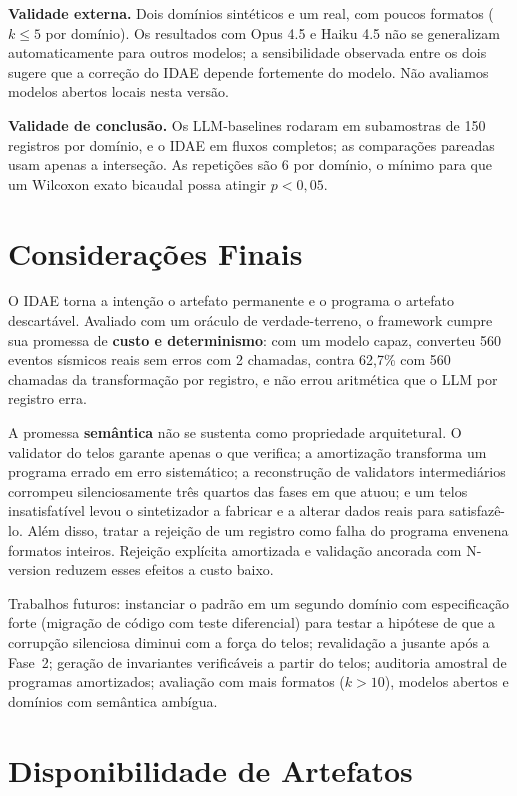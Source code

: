 \documentclass[sigconf,nonacm]{acmart}
\begin{document}
\textbf{Validade externa.} Dois domínios sintéticos e um real, com poucos formatos ($k \le 5$ por domínio). Os resultados com Opus 4.5 e Haiku 4.5 não se generalizam automaticamente para outros modelos; a sensibilidade observada entre os dois sugere que a correção do IDAE depende fortemente do modelo. Não avaliamos modelos abertos locais nesta versão.

\textbf{Validade de conclusão.} Os LLM-baselines rodaram em subamostras de 150 registros por domínio, e o IDAE em fluxos completos; as comparações pareadas usam apenas a interseção. As repetições são 6 por domínio, o mínimo para que um Wilcoxon exato bicaudal possa atingir $p < 0{,}05$.

\section{Considerações Finais}

O IDAE torna a intenção o artefato permanente e o programa o artefato descartável. Avaliado com um oráculo de verdade-terreno, o framework cumpre sua promessa de \textbf{custo e determinismo}: com um modelo capaz, converteu 560 eventos sísmicos reais sem erros com 2 chamadas, contra 62,7\% com 560 chamadas da transformação por registro, e não errou aritmética que o LLM por registro erra.

A promessa \textbf{semântica} não se sustenta como propriedade arquitetural. O validator do telos garante apenas o que verifica; a amortização transforma um programa errado em erro sistemático; a reconstrução de validators intermediários corrompeu silenciosamente três quartos das fases em que atuou; e um telos insatisfatível levou o sintetizador a fabricar e a alterar dados reais para satisfazê-lo. Além disso, tratar a rejeição de um registro como falha do programa envenena formatos inteiros. Rejeição explícita amortizada e validação ancorada com N-version reduzem esses efeitos a custo baixo.

Trabalhos futuros: instanciar o padrão em um segundo domínio com especificação forte (migração de código com teste diferencial) para testar a hipótese de que a corrupção silenciosa diminui com a força do telos; revalidação a jusante após a Fase~2; geração de invariantes verificáveis a partir do telos; auditoria amostral de programas amortizados; avaliação com mais formatos ($k > 10$), modelos abertos e domínios com semântica ambígua.

\section*{Disponibilidade de Artefatos}
\label{sec:artifacts}
\end{document}
